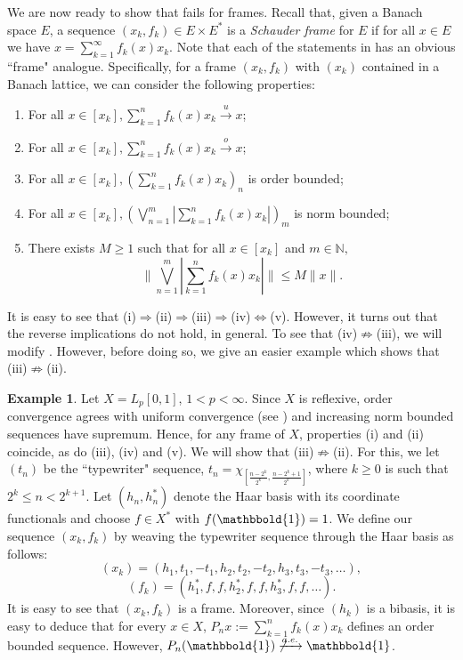 \documentclass[12pt,leqno]{amsart}
\numberwithin{equation}{section}
\theoremstyle{definition}
\newtheorem{example}[theorem]{Example}
\def\one{\mathbbold{1}}
\begin{document}
We are now ready to show that  fails for frames. Recall that, given  a Banach space $E$,  a sequence $(x_k,f_k)\in E\times E^*$ is a \emph{Schauder frame} for $E$ if for all $x\in E$ we have $x=\sum_{k=1}^\infty f_k(x)x_k$. Note that each of the statements in  has an obvious  ``frame" analogue. Specifically, for a frame $(x_k,f_k)$ with $(x_k)$ contained in a Banach lattice,  we can consider the following properties:
\begin{enumerate}
\item For all $x\in [x_k], \sum_{k=1}^nf_k(x)x_k\xrightarrow{u}x$;
\item For all $x\in [x_k], \sum_{k=1}^nf_k(x)x_k\xrightarrow{o}x$;
\item For all $x\in [x_k], \left(\sum_{k=1}^nf_k(x)x_k\right)_n$ is order bounded;
\item  For all $x\in [x_k], \left(\bigvee_{n=1}^m\left|\sum_{k=1}^nf_k(x)x_k\right|\right)_m$ is norm bounded;
\item There exists $M\geq 1$ such that for all $x\in [x_k]$ and  $m\in \mathbb{N},$ $$\bigg\|\bigvee_{n=1}^m\left|\sum_{k=1}^nf_k(x)x_k\right|\bigg\|\leq M\|x\|.$$
\end{enumerate}
It is easy to see that (i)$\Rightarrow$(ii)$\Rightarrow$(iii)$\Rightarrow$(iv)$\Leftrightarrow$(v). However, it turns out that the reverse implications do not hold, in general. To see that (iv)$\not\Rightarrow$(iii), we will modify . However, before  doing so, we give an easier example which shows that  (iii)$\not\Rightarrow$(ii). 
\begin{example}\label{example}
Let $X=L_p[0,1]$, $1<p<\infty$. Since $X$ is reflexive, order convergence agrees with uniform convergence (see \cite{Bed-Wirth}) and increasing norm bounded sequences have supremum. 
Hence, for any frame of $X$, properties (i) and (ii) coincide, as do (iii), (iv) and (v). We will show that (iii)$\not\Rightarrow$(ii). For this, we let $(t_n)$ be the ``typewriter" sequence, $t_n=\chi_{[\frac{n-2^k}{2^k},\frac{n-2^k+1}{2^k}]}$, where $k\geq 0$ is such that $2^k\leq n<2^{k+1}$. Let $(h_n,h_n^*)$ denote the Haar basis with its coordinate functionals and choose $f\in X^*$ with $f(\one)=1$. We define our sequence $(x_k,f_k)$ by weaving the typewriter sequence through the Haar basis as follows: $$(x_k)=(h_1,t_1,-t_1,h_2,t_2,-t_2,h_3,t_3,-t_3,\dots),$$ $$(f_k)=(h_1^*,f,f,h_2^*,f,f,h_3^*,f,f,\dots).$$
It is  easy to see that $(x_k,f_k)$ is a frame. Moreover, since $(h_k)$ is a bibasis, it is easy to deduce that for every $x\in X$, $P_nx:=\sum_{k=1}^n f_k(x)x_k$ defines an order bounded sequence. However, $P_n(\one)\not\xrightarrow{a.e.}\one$.
\end{example}
\end{document}
